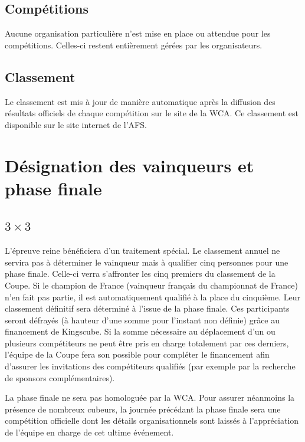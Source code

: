 \documentclass[10pt,a4paper]{article}
\newcommand{\3}{$3\times3$}
\newcommand{\4}{$4\times4$}
\newcommand{\2}{$2\times2$}
\begin{document}
\subsection{Compétitions}

Aucune organisation particulière n'est mise en place ou attendue pour les compétitions. Celles-ci restent entièrement gérées par les organisateurs.

\subsection{Classement}

Le classement est mis à jour de manière automatique après la diffusion des résultats officiels de chaque compétition sur le site de la WCA. Ce classement est disponible sur le site internet de l'AFS.

\section{Désignation des vainqueurs et phase finale}

\subsection{\3}

L'épreuve reine bénéficiera d'un traitement spécial. Le classement annuel ne servira pas à déterminer le vainqueur mais à qualifier cinq personnes pour une phase finale. Celle-ci verra s'affronter les cinq premiers du classement de la Coupe. Si le champion de France (vainqueur français du championnat de France) n'en fait pas partie, il est automatiquement qualifié à la place du cinquième. Leur classement définitif sera déterminé à l'issue de la phase finale. Ces participants seront défrayés (à hauteur d'une somme pour l'instant non définie) grâce au financement de Kingscube. Si la somme nécessaire au déplacement d'un ou plusieurs compétiteurs ne peut être pris en charge totalement par ces derniers, l'équipe de la Coupe fera son possible pour compléter le financement afin d'assurer les invitations des compétiteurs qualifiés (par exemple par la recherche de sponsors complémentaires).

La phase finale ne sera pas homologuée par la WCA. Pour assurer néanmoins la présence de nombreux cubeurs, la journée précédant la phase finale sera une compétition officielle dont les détails organisationnels sont laissés à l'appréciation de l'équipe en charge de cet ultime événement.
\end{document}
